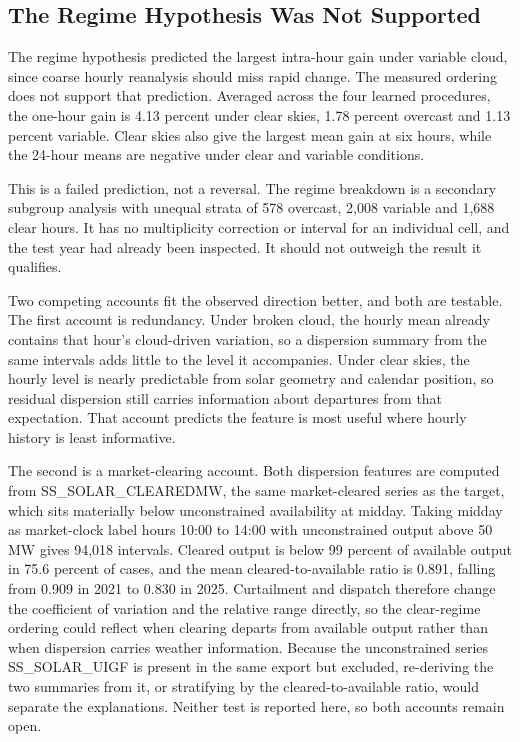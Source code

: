 \subsection{The Regime Hypothesis Was Not Supported}

The regime hypothesis predicted the largest intra-hour gain under variable cloud, since coarse hourly reanalysis should miss rapid change. The measured ordering does not support that prediction. Averaged across the four learned procedures, the one-hour gain is 4.13 percent under clear skies, 1.78 percent overcast and 1.13 percent variable. Clear skies also give the largest mean gain at six hours, while the 24-hour means are negative under clear and variable conditions.

This is a failed prediction, not a reversal. The regime breakdown is a secondary subgroup analysis with unequal strata of 578 overcast, 2,008 variable and 1,688 clear hours. It has no multiplicity correction or interval for an individual cell, and the test year had already been inspected. It should not outweigh the result it qualifies.

Two competing accounts fit the observed direction better, and both are testable. The first account is redundancy. Under broken cloud, the hourly mean already contains that hour's cloud-driven variation, so a dispersion summary from the same intervals adds little to the level it accompanies. Under clear skies, the hourly level is nearly predictable from solar geometry and calendar position, so residual dispersion still carries information about departures from that expectation. That account predicts the feature is most useful where hourly history is least informative.

The second is a market-clearing account. Both dispersion features are computed from SS\_\allowbreak{}SOLAR\_\allowbreak{}CLEAREDMW, the same market-cleared series as the target, which sits materially below unconstrained availability at midday. Taking midday as market-clock label hours 10:00 to 14:00 with unconstrained output above 50 MW gives 94,018 intervals. Cleared output is below 99 percent of available output in 75.6 percent of cases, and the mean cleared-to-available ratio is 0.891, falling from 0.909 in 2021 to 0.830 in 2025. Curtailment and dispatch therefore change the coefficient of variation and the relative range directly, so the clear-regime ordering could reflect when clearing departs from available output rather than when dispersion carries weather information. Because the unconstrained series SS\_\allowbreak{}SOLAR\_\allowbreak{}UIGF is present in the same export but excluded, re-deriving the two summaries from it, or stratifying by the cleared-to-available ratio, would separate the explanations. Neither test is reported here, so both accounts remain open.

